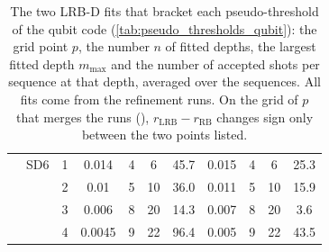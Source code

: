 \begin{table}[tp]
\begin{tabular}{llc|cccc|cccc}
    \hline
     & SD6 & 1 & 0.014 & 4 & 6 & 45.7 & 0.015 & 4 & 6 & 25.3 \\
     &  & 2 & 0.01 & 5 & 10 & 36.0 & 0.011 & 5 & 10 & 15.9 \\
     &  & 3 & 0.006 & 8 & 20 & 14.3 & 0.007 & 8 & 20 & 3.6 \\
     &  & 4 & 0.0045 & 9 & 22 & 96.4 & 0.005 & 9 & 22 & 43.5 \\
    \hline
  \end{tabular}
  \caption{The two LRB-D fits that bracket each pseudo-threshold of the qubit code (\autoref{tab:pseudo_thresholds_qubit}): the grid point $p$, the number $n$ of fitted depths, the largest fitted depth $m_{\max}$ and the number of accepted shots per sequence at that depth, averaged over the sequences. All fits come from the refinement runs. On the grid of $p$ that merges the runs (), $r_{\mathrm{LRB}} - r_{\mathrm{RB}}$ changes sign only between the two points listed.}
  \label{tab:brackets_qubit}
\end{table}
